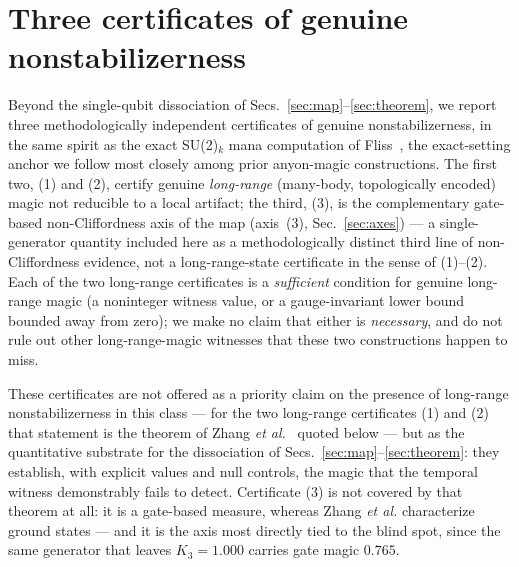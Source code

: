\documentclass[aps,pra,twocolumn,superscriptaddress,longbibliography,floatfix,nofootinbib]{revtex4-2}
\begin{document}
\section{Three certificates of genuine nonstabilizerness}
\label{sec:lrn}

Beyond the single-qubit dissociation of Secs.~\ref{sec:map}--\ref{sec:theorem},
we report three methodologically independent certificates of genuine
nonstabilizerness, in the same spirit as the exact SU(2)$_k$ mana
computation of Fliss~\cite{Fliss2021}, the exact-setting anchor we
follow most closely among prior anyon-magic constructions. The first
two, (1) and (2), certify genuine \emph{long-range} (many-body,
topologically encoded) magic not reducible to a local artifact; the
third, (3), is the complementary gate-based non-Cliffordness axis of
the map (axis~(3), Sec.~\ref{sec:axes}) --- a single-generator
quantity included here as a methodologically distinct third line of
non-Cliffordness evidence, not a long-range-state certificate in the
sense of (1)--(2). Each of the two long-range certificates is a
\emph{sufficient} condition for genuine long-range magic (a
noninteger witness value, or a gauge-invariant lower bound bounded
away from zero); we make no claim that either is \emph{necessary}, and
do not rule out other long-range-magic witnesses that these two
constructions happen to miss.

These certificates are not offered as a priority claim on the presence
of long-range nonstabilizerness in this class --- for the two
long-range certificates (1) and (2) that statement is the theorem of
Zhang \emph{et al.}~\cite{Zhang2026} quoted below --- but as the
quantitative substrate for the dissociation of
Secs.~\ref{sec:map}--\ref{sec:theorem}: they establish, with explicit
values and null controls, the magic that the temporal witness
demonstrably fails to detect. Certificate (3) is not covered by that
theorem at all: it is a gate-based measure, whereas Zhang \emph{et al.}
characterize ground states --- and it is the axis most directly tied to
the blind spot, since the same generator that leaves $K_3=1.000$
carries gate magic $0.765$.
\end{document}
